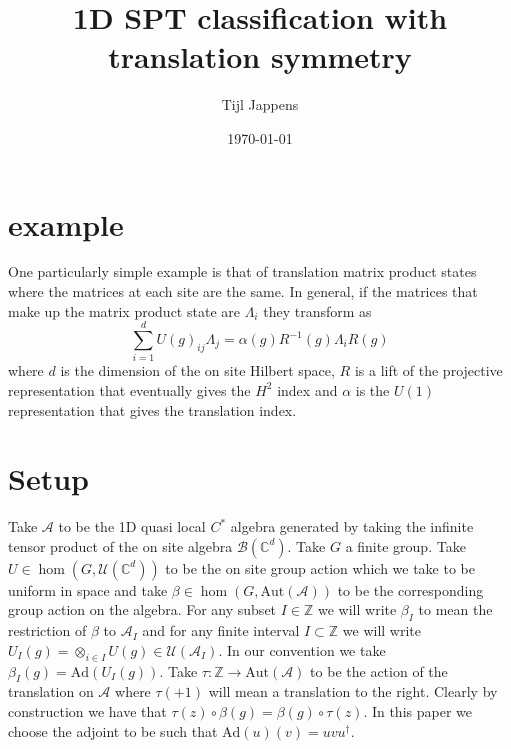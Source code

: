 \documentclass[12pt,a4paper,twoside]{article}
\title{1D SPT classification with translation symmetry}
\author{Tijl Jappens}
\date{\today}
\newcommand{\UU}{\mathcal U}
\newcommand{\BB}{\mathcal B}
\newcommand{\ZZ}{\mathbb Z}
\newcommand{\CC}{\mathbb C}
\renewcommand{\AA}{\mathcal A}
\newcommand{\Ad}{\textrm{Ad}}
\theoremstyle{definition}
\numberwithin{equation}{section}
\begin{document}
\section{example}
One particularly simple example is that of translation matrix product states where the matrices at each site are the same. In general, if the matrices that make up the matrix product state are $\Lambda_i$ they transform as
\begin{equation}
	\sum_{i=1}^d U(g)_{ij}\Lambda_j=\alpha(g) R^{-1}(g)\Lambda_i R(g)
\end{equation}
where $d$ is the dimension of the on site Hilbert space, $R$ is a lift of the projective representation that eventually gives the $H^2$ index and $\alpha$ is the $U(1)$ representation that gives the translation index.
\section{Setup}
Take $\AA$ to be the 1D quasi local $C^*$ algebra generated by taking the infinite tensor product of the on site algebra $\BB(\CC^d)$. Take $G$ a finite group. Take $U\in\hom(G,\UU(\CC^d))$ to be the on site group action which we take to be uniform in space and take $\beta\in\hom(G,\text{Aut}(\AA))$ to be the corresponding group action on the algebra. For any subset $I\in\ZZ$ we will write $\beta_I$ to mean the restriction of $\beta$ to $\AA_I$ and for any finite interval $I\subset\ZZ$ we will write $U_I(g)=\otimes_{i\in I}U(g)\in\UU(\AA_I)$. In our convention we take $\beta_I(g)=\Ad(U_I(g))$. Take $\tau:\ZZ\rightarrow\text{Aut}(\AA)$ to be the action of the translation on $\AA$ where $\tau(+1)$ will mean a translation to the right. Clearly by construction we have that $\tau(z)\circ\beta(g)=\beta(g)\circ\tau(z)$. In this paper we choose the adjoint to be such that $\Ad(u)(v)=uvu^\dagger$.
\end{document}
